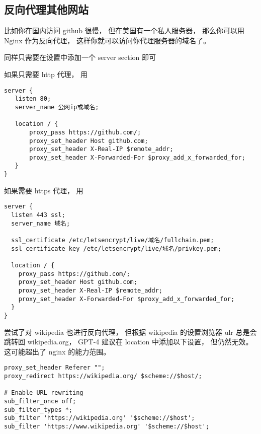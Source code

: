 \subsection{反向代理其他网站}
比如你在国内访问 github 很慢， 但在美国有一个私人服务器， 那么你可以用 Nginx 作为反向代理， 这样你就可以访问你代理服务器的域名了。

同样只需要在设置中添加一个 server section 即可

如果只需要 http 代理， 用
\begin{lstlisting}[language=none]
server {
   listen 80;
   server_name 公网ip或域名;

   location / {
       proxy_pass https://github.com/;
       proxy_set_header Host github.com;
       proxy_set_header X-Real-IP $remote_addr;
       proxy_set_header X-Forwarded-For $proxy_add_x_forwarded_for;
   }
}
\end{lstlisting}

如果需要 https 代理， 用
\begin{lstlisting}[language=none]
server {
  listen 443 ssl;
  server_name 域名;

  ssl_certificate /etc/letsencrypt/live/域名/fullchain.pem;
  ssl_certificate_key /etc/letsencrypt/live/域名/privkey.pem;

  location / {
    proxy_pass https://github.com/;
    proxy_set_header Host github.com;
    proxy_set_header X-Real-IP $remote_addr;
    proxy_set_header X-Forwarded-For $proxy_add_x_forwarded_for;
  }
}
\end{lstlisting}

尝试了对 wikipedia 也进行反向代理， 但根据 wikipedia 的设置浏览器 ulr 总是会跳转回 wikipedia.org， GPT-4 建议在 location 中添加以下设置， 但仍然无效。 这可能超出了 nginx 的能力范围。
\begin{lstlisting}[language=none]
proxy_set_header Referer "";
proxy_redirect https://wikipedia.org/ $scheme://$host/;

# Enable URL rewriting
sub_filter_once off;
sub_filter_types *;
sub_filter 'https://wikipedia.org' '$scheme://$host';
sub_filter 'https://www.wikipedia.org' '$scheme://$host';
\end{lstlisting}

